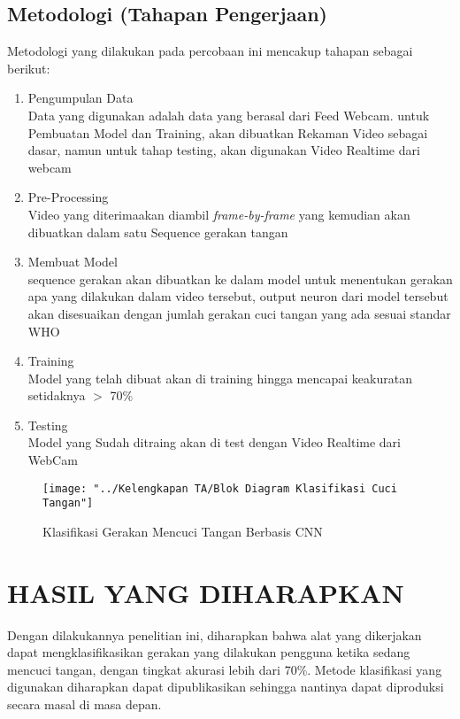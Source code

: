 \documentclass[a4paper]{article}
\begin{document}
		\subsection{Metodologi (Tahapan Pengerjaan)}
			Metodologi yang dilakukan pada percobaan ini mencakup tahapan sebagai berikut:
			\begin{enumerate}
				\item Pengumpulan Data\\
				Data yang digunakan adalah data yang berasal dari Feed Webcam.
				untuk Pembuatan Model dan Training, akan dibuatkan Rekaman Video sebagai dasar, namun untuk tahap testing, akan digunakan Video Realtime dari webcam
				\item Pre-Processing\\
				Video yang diterimaakan diambil \textit{frame-by-frame} yang kemudian akan dibuatkan dalam satu Sequence gerakan tangan
				\item Membuat Model\\
				sequence gerakan akan dibuatkan ke dalam model untuk menentukan gerakan apa yang dilakukan dalam video tersebut, output neuron dari model tersebut akan disesuaikan dengan jumlah gerakan cuci tangan yang ada sesuai standar WHO
				\item Training\\
				Model yang telah dibuat akan di training hingga mencapai keakuratan setidaknya $>$ 70\%
				\item Testing\\
				Model yang Sudah ditraing akan di test dengan Video Realtime dari WebCam
			\end{enumerate}
		
			\begin{figure}[h]
				\centering
				\texttt{[image: "../Kelengkapan TA/Blok Diagram Klasifikasi Cuci Tangan"]}
				\caption[Block Diagram]{Klasifikasi Gerakan Mencuci Tangan Berbasis CNN}
				\label{fig:blok-diagram-klasifikasi-cuci-tangan}
			\end{figure}
			
			
	\newpage
	\section{HASIL YANG DIHARAPKAN}
	\hspace{10mm}Dengan dilakukannya penelitian ini, diharapkan bahwa alat yang dikerjakan dapat mengklasifikasikan gerakan yang dilakukan pengguna ketika sedang mencuci tangan, dengan tingkat akurasi lebih dari 70\%. Metode klasifikasi yang digunakan diharapkan dapat dipublikasikan sehingga nantinya dapat diproduksi secara masal di masa depan.
\end{document}
